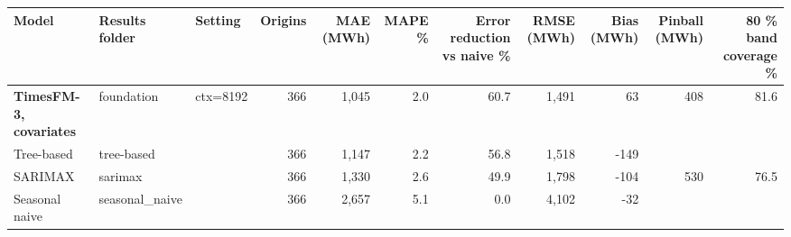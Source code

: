\begin{tabular}{lllrrrrrrrr}
\toprule
Model & Results folder & Setting & Origins & MAE (MWh) & MAPE \% & Error reduction vs naive \% & RMSE (MWh) & Bias (MWh) & Pinball (MWh) & 80 \% band coverage \% \\
\midrule
\textbf{TimesFM-3, covariates} & foundation & ctx=8192 & 366 & 1,045 & 2.0 & 60.7 & 1,491 & 63 & 408 & 81.6 \\
Tree-based & tree-based &  & 366 & 1,147 & 2.2 & 56.8 & 1,518 & -149 &  &  \\
SARIMAX & sarimax &  & 366 & 1,330 & 2.6 & 49.9 & 1,798 & -104 & 530 & 76.5 \\
Seasonal naive & seasonal\_naive &  & 366 & 2,657 & 5.1 & 0.0 & 4,102 & -32 &  &  \\
\bottomrule
\end{tabular}
